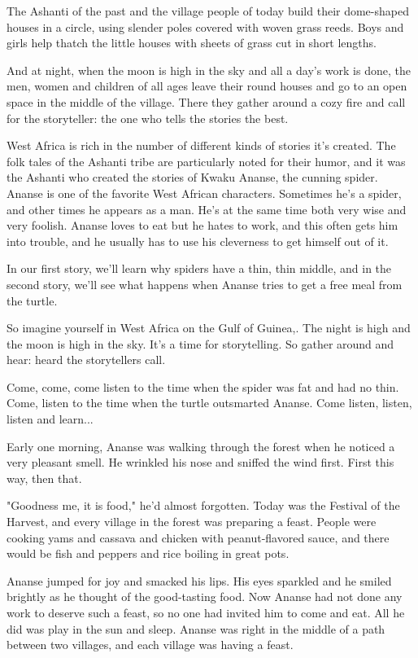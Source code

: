 The Ashanti of the past and the village people of today build their dome-shaped houses in a circle, using slender poles covered with woven grass reeds. Boys and girls help thatch the little houses with sheets of grass cut in short lengths.

And at night, when the moon is high in the sky and all a day's work is done, the men, women and children of all ages leave their round houses and go to an open space in the middle of the village. There they gather around a cozy fire and call for the storyteller: the one who tells the stories the best.

West Africa is rich in the number of different kinds of stories it's created. The folk tales of the Ashanti tribe are particularly noted for their humor, and it was the Ashanti who created the stories of Kwaku Ananse, the cunning spider. Ananse is one of the favorite West African characters. Sometimes he's a spider, and other times he appears as a man. He's at the same time both very wise and very foolish. Ananse loves to eat but he hates to work, and this often gets him into trouble, and he usually has to use his cleverness to get himself out of it.

In our first story, we'll learn why spiders have a thin, thin middle, and in the second story, we'll see what happens when Ananse tries to get a free meal from the turtle.

So imagine yourself in West Africa on the Gulf of Guinea,. The night is high and the moon is high in the sky. It's a time for storytelling. So gather around and hear: heard the storytellers call.

Come, come, come listen to the time when the spider was fat and had no thin. Come, listen to the time when the turtle outsmarted Ananse. Come listen, listen, listen and learn...

Early one morning, Ananse was walking through the forest when he noticed a very pleasant smell. He wrinkled his nose and sniffed the wind first. First this way, then that.

"Goodness me, it is food," he'd almost forgotten. Today was the Festival of the Harvest, and every village in the forest was preparing a feast. People were cooking yams and cassava and chicken with peanut-flavored sauce, and there would be fish and peppers and rice boiling in great pots.

Ananse jumped for joy and smacked his lips. His eyes sparkled and he smiled brightly as he thought of the good-tasting food. Now Ananse had not done any work to deserve such a feast, so no one had invited him to come and eat. All he did was play in the sun and sleep. Ananse was right in the middle of a path between two villages, and each village was having a feast.

